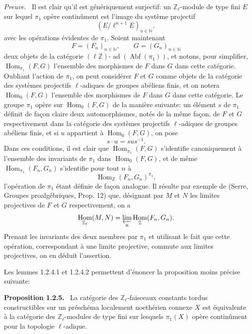 \documentclass[11pt]{article}
\newenvironment{statement}[1]{\par\medskip\noindent\textbf{#1.}\ }{\par\medskip}
\newenvironment{prooftext}[1][Proof]{\par\noindent\emph{#1.}\ }{\par\medskip}
\DeclareMathOperator{\Hom}{Hom}
\providecommand{\Hom}{\operatorname{Hom}}
\providecommand{\Abf}{\operatorname{Abf}}
\providecommand{\ad}{\operatorname{ad}}
\providecommand{\Hom}{\operatorname{Hom}}
\begin{document}
\begin{prooftext}[Preuve]
Il est clair qu'il est génériquement surjectif: un \(\mathbb Z_\ell\)-module de type fini \(E\) sur lequel \(\pi_1\) opère continûment est l'image du système projectif
\[
(E/\ell^{n+1}E)_{n\in\mathbb N},
\]
avec les opérations évidentes de \(\pi_1\). Soient maintenant
\[
F=(F_n)_{n\in\mathbb N},\qquad G=(G_n)_{n\in\mathbb N}
\]
deux objets de la catégorie \((\ell\mathbb Z)\text{-}\ad(\Abf(\pi_1))\), et notons, pour simplifier, \(\Hom_{\pi_1}(F,G)\) l'ensemble des morphismes de \(F\) dans \(G\) dans cette catégorie. Oubliant l'action de \(\pi_1\), on peut considérer \(F\) et \(G\) comme objets de la catégorie des systèmes projectifs \(\ell\)-adiques de groupes abéliens finis, et on notera \(\Hom_0(F,G)\) l'ensemble des morphismes de \(F\) dans \(G\) dans cette catégorie. Le groupe \(\pi_1\) opère sur \(\Hom_0(F,G)\) de la manière suivante: un élément \(s\) de \(\pi_1\) définit de façon claire deux automorphismes, notés de la même façon, de \(F\) et \(G\) respectivement dans la catégorie des systèmes projectifs \(\ell\)-adiques de groupes abéliens finis, et si \(u\) appartient à \(\Hom_0(F,G)\), on pose
\[
s\cdot u=sus^{-1}.
\]
Dans ces conditions, il est clair que \(\Hom_{\pi_1}(F,G)\) s'identifie canoniquement à l'ensemble des invariants de \(\pi_1\) dans \(\Hom_0(F,G)\), et de même \(\Hom_{\pi_1}(F_n,G_n)\) s'identifie pour tout \(n\) à
\[
\Hom_{\mathbb Z}(F_n,G_n)^{\pi_1},
\]
l'opération de \(\pi_1\) étant définie de façon analogue. Il résulte par exemple de (Serre, Groupes proalgébriques, Prop. 12) que, désignant par \(M\) et \(N\) les limites projectives de \(F\) et \(G\) respectivement, on a
\[
\Hom_{\mathbb Z_\ell}(M,N)=\varprojlim_n\Hom_{\mathbb Z}(F_n,G_n).
\]
Prenant les invariants des deux membres par \(\pi_1\) et utilisant le fait que cette opération, correspondant à une limite projective, commute aux limites projectives, on en déduit l'assertion.
\end{prooftext}

Les lemmes 1.2.4.1 et 1.2.4.2 permettent d'énoncer la proposition moins précise suivante:

\begin{statement}{Proposition 1.2.5}
La catégorie des \(\mathbb Z_\ell\)-faisceaux constants tordus constructibles sur un préschéma localement noethérien connexe \(X\) est équivalente à la catégorie des \(\mathbb Z_\ell\)-modules de type fini sur lesquels \(\pi_1(X)\) opère continûment pour la topologie \(\ell\)-adique.
\end{statement}
\end{document}

